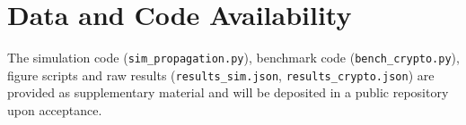 \documentclass[journal]{IEEEtran}
\begin{document}
\section*{Data and Code Availability}
The simulation code (\texttt{sim\_propagation.py}), benchmark code (\texttt{bench\_crypto.py}), figure scripts and raw results (\texttt{results\_sim.json}, \texttt{results\_crypto.json}) are provided as supplementary material and will be deposited in a public repository upon acceptance.



\end{document}
